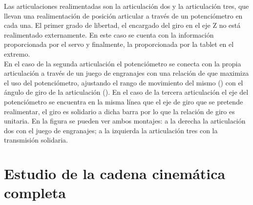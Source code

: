 
	Las articulaciones realimentadas son la articulación dos y la articulación tres, que llevan una realimentación de posición articular a través de un potenciómetro en cada una. El primer grado de libertad, el encargado del giro en el eje Z no está realimentado externamente. En este caso se cuenta con la información proporcionada por el servo y finalmente, la proporcionada por la tablet en el extremo.
	\\

	En el caso de la segunda articulación el potenciómetro se conecta con la propia articulación a través de un juego de engranajes con una relación de \completar que maximiza el uso del potenciómetro, ajustando el rango de movimiento del mismo () con el ángulo de giro de la articulación (). En el caso de la tercera articulación el eje del potenciómetro se encuentra en la misma línea que el eje de giro que se pretende realimentar, el giro es solidario a dicha barra por lo que la relación de giro es unitaria. En la figura \completar se pueden ver ambos montajes: a la derecha la articulación dos con el juego de engranajes; a la izquierda la articulación tres con la transmisión solidaria.


\section{Estudio de la cadena cinemática completa} \label{sec:Mecanica:cadena_cinematica}

